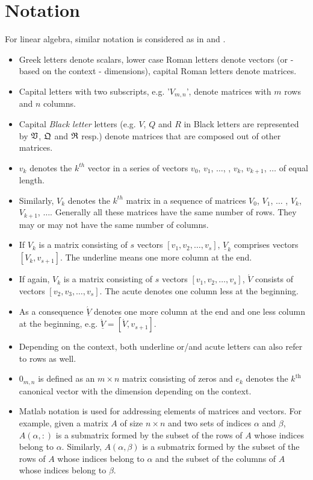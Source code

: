 \documentclass{scrartcl}
\begin{document}
\pagebreak

\tableofcontents

\pagebreak

\section{Notation}
For linear algebra, similar notation is considered as in \cite{Hoemmen:2010:CKS:1970638} and \cite{Grigori}.
\begin{itemize}
\item Greek letters denote scalars, lower case Roman letters denote vectors (or - based on the context - dimensions), capital Roman letters denote matrices.
\item Capital letters with two subscripts, e.g. '$V_{m, n}$', denote matrices with $m$ rows and $n$ columns.
\item Capital \textit{Black letter} letters (e.g. $V$, $Q$ and $R$ in Black letters are represented by $\frak{V}$, $\frak{Q}$ and $\frak{R}$ resp.) denote matrices that are composed out of other matrices. 
\item $v_k$ denotes the $k^{th}$ vector in a series of vectors $v_0$, $v_1$, $\ldots$, ,  $v_k$, $v_{k+1}$, $\ldots$ of equal length.
\item Similarly, $V_k$ denotes the $k^{th}$ matrix in a sequence of matrices $V_0$, $V_1$, $\ldots$ , $V_k$, $V_{k+1}$, $\ldots$. Generally all these matrices have the same number of rows. They may or may not have the same number of columns.
\item If $V_k$ is a matrix consisting of $s$ vectors $\left[v_1, v_2, \ldots, v_s\right]$, $\underline{V}_k$ comprises vectors $\left[V_k, v_{s+1} \right]$. The underline means one more column at the end.
\item If again, $V_k$ is a matrix consisting of $s$ vectors $\left[v_1, v_2, \ldots, v_s\right]$, $\acute{V}$ consists of vectors $[v_2, v_3, \ldots, v_s]$. The acute denotes one column less at the beginning.
\item As a consequence $\underline{\acute{V}}$ denotes one more column at the end and one less column at the beginning, e.g. $\underline{\acute{V}} = [\acute{V}, v_{s+1}]$.
\item Depending on the context, both underline or/and acute letters can also refer to rows as well. 
\item $0_{m, n}$ is defined as an $m \times n$ matrix consisting of zeros and $e_k$ denotes the $k^{\text{th}}$ canonical vector with the dimension depending on the context.
\item Matlab notation is used for addressing elements of matrices and vectors. For example, given a matrix $A$ of size $n \times n$ and two sets of indices $\alpha$ and $\beta$, $A(\alpha,:)$ is a submatrix formed by the subset of the rows of $A$ whose indices belong to $\alpha$. Similarly, $A(\alpha, \beta)$ is a submatrix formed by the subset of the rows of $A$ whose indices belong to $\alpha$ and the subset of the columns of $A$ whose indices belong to $\beta$.

\end{itemize}
\pagebreak
\end{document}
